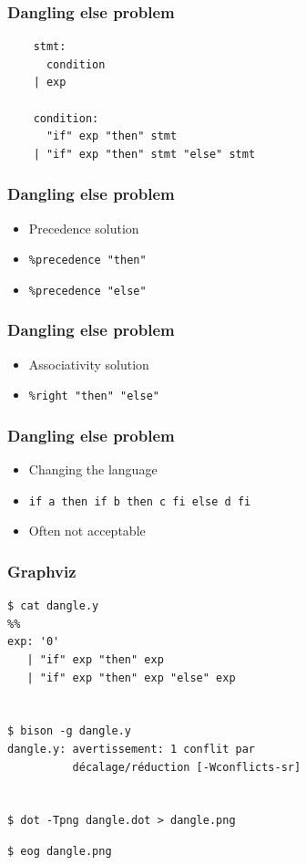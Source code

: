 \documentclass{beamer}
\begin{document}
\begin{frame}[fragile]
  \frametitle{Dangling else problem}
\begin{verbatim}
    stmt:
      condition
    | exp

    condition:
      "if" exp "then" stmt
    | "if" exp "then" stmt "else" stmt
\end{verbatim}
\end{frame}

\begin{frame}
  \frametitle{Dangling else problem}
    \begin{itemize}
      \item Precedence solution
      \item \texttt{\%precedence "then"}
      \item \texttt{\%precedence "else"}
    \end{itemize}
\end{frame}

\begin{frame}
  \frametitle{Dangling else problem}
    \begin{itemize}
      \item Associativity solution
      \item \texttt{\%right "then" "else"}
    \end{itemize}
\end{frame}

\begin{frame}
  \frametitle{Dangling else problem}
    \begin{itemize}
      \item Changing the language
      \item \texttt{if a then if b then c fi else d fi}
      \item Often not acceptable
    \end{itemize}
\end{frame}

\begin{frame}[fragile]
  \frametitle{Graphviz}
\begin{verbatim}
$ cat dangle.y
%%
exp: '0'
   | "if" exp "then" exp
   | "if" exp "then" exp "else" exp


$ bison -g dangle.y
dangle.y: avertissement: 1 conflit par
          décalage/réduction [-Wconflicts-sr]


$ dot -Tpng dangle.dot > dangle.png
\end{verbatim}

\pause

\begin{verbatim}
$ eog dangle.png
\end{verbatim}
\end{frame}
\end{document}
